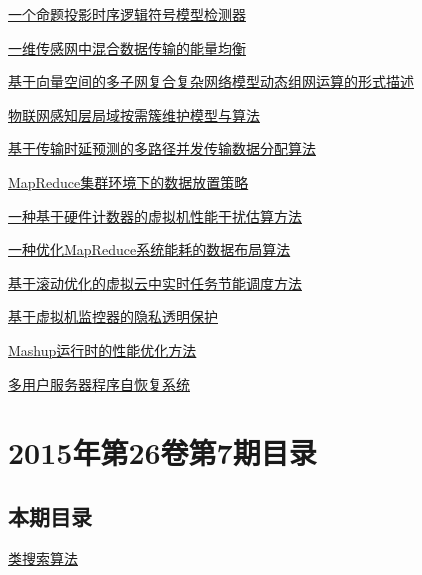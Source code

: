 \documentclass[a4paper]{article}
\begin{document}
\href{http://www.jos.org.cn/ch/reader/download_pdf.aspx?file_no=4689&year_id=2015&quarter_id=8&falg=1}{一个命题投影时序逻辑符号模型检测器}

\href{http://www.jos.org.cn/ch/reader/download_pdf.aspx?file_no=4710&year_id=2015&quarter_id=8&falg=1}{一维传感网中混合数据传输的能量均衡}

\href{http://www.jos.org.cn/ch/reader/download_pdf.aspx?file_no=4697&year_id=2015&quarter_id=8&falg=1}{基于向量空间的多子网复合复杂网络模型动态组网运算的形式描述}

\href{http://www.jos.org.cn/ch/reader/download_pdf.aspx?file_no=4675&year_id=2015&quarter_id=8&falg=1}{物联网感知层局域按需簇维护模型与算法}

\href{http://www.jos.org.cn/ch/reader/download_pdf.aspx?file_no=4691&year_id=2015&quarter_id=8&falg=1}{基于传输时延预测的多路径并发传输数据分配算法}

\href{http://www.jos.org.cn/ch/reader/download_pdf.aspx?file_no=4807&year_id=2015&quarter_id=8&falg=1}{MapReduce集群环境下的数据放置策略}

\href{http://www.jos.org.cn/ch/reader/download_pdf.aspx?file_no=4709&year_id=2015&quarter_id=8&falg=1}{一种基于硬件计数器的虚拟机性能干扰估算方法}

\href{http://www.jos.org.cn/ch/reader/download_pdf.aspx?file_no=4802&year_id=2015&quarter_id=8&falg=1}{一种优化MapReduce系统能耗的数据布局算法}

\href{http://www.jos.org.cn/ch/reader/download_pdf.aspx?file_no=4670&year_id=2015&quarter_id=8&falg=1}{基于滚动优化的虚拟云中实时任务节能调度方法}

\href{http://www.jos.org.cn/ch/reader/download_pdf.aspx?file_no=4684&year_id=2015&quarter_id=8&falg=1}{基于虚拟机监控器的隐私透明保护}

\href{http://www.jos.org.cn/ch/reader/download_pdf.aspx?file_no=4733&year_id=2015&quarter_id=8&falg=1}{Mashup运行时的性能优化方法}

\href{http://www.jos.org.cn/ch/reader/download_pdf.aspx?file_no=4685&year_id=2015&quarter_id=8&falg=1}{多用户服务器程序自恢复系统}


\section{\textbf{2015年第26卷第7期目录}}
\subsection{本期目录}
\href{http://www.jos.org.cn/ch/reader/download_pdf.aspx?file_no=4613&year_id=2015&quarter_id=7&falg=1}{类搜索算法}
\end{document}
